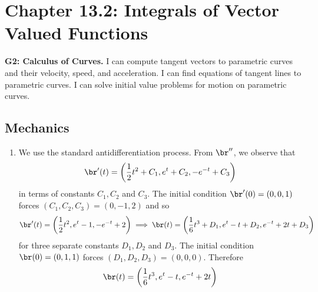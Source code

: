 \fancyhead[R]{\dayfour}

\section*{\centering Chapter 13.2: Integrals of Vector Valued Functions}
\textbf{G2: Calculus of Curves.} I can compute tangent vectors to parametric curves and their velocity, speed, and acceleration. I can find equations of tangent lines to parametric curves. I can solve initial value problems for motion on parametric curves.

\subsection*{Mechanics}
\begin{enumerate}
    \item {}
    {%

    }
    {We use the standard antidifferentiation process. From $\br''$, we observe that
\begin{equation*}
    \br'(t) = \left(\frac{1}{2}t^2 + C_1, e^t+C_2, -e^{-t}+C_3\right)
\end{equation*}
in terms of constants $C_1, C_2$ and $C_3$. The initial condition $\br'(0)=(0,0,1)$ forces $(C_1,C_2,C_3) = (0,-1,2)$ and so 
\begin{equation*}
    \br'(t) = \left(\frac{1}{2}t^2, e^t-1, -e^{-t}+2\right) \implies \br(t) = \left(\frac{1}{6}t^3+D_1, e^t-t+D_2, e^{-t}+2t+D_3\right)
\end{equation*}
for three separate constants $D_1,D_2$ and $D_3$. The initial condition $\br(0)= (0,1,1)$ forces $(D_1,D_2,D_3) = (0,0,0)$. Therefore
\begin{equation*}
    \br(t) = \left(\frac{1}{6}t^3, e^t-t, e^{-t}+2t\right)
\end{equation*}
    } 
\end{enumerate}

